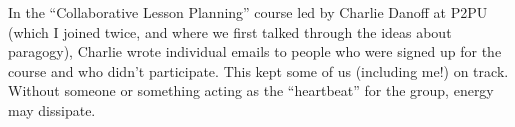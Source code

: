 In the ``Collaborative Lesson Planning'' course led by Charlie Danoff at
P2PU (which I joined twice, and where we first talked through the ideas
about paragogy), Charlie wrote individual emails to people who were
signed up for the course and who didn't participate. This kept some of
us (including me!) on track. Without someone or something acting as the
``heartbeat'' for the group, energy may dissipate.
